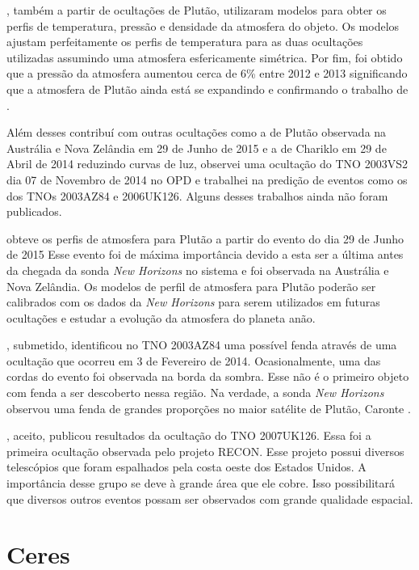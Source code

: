 \documentclass[12pt,a4paper]{report}
\begin{document}
\cite{DiasOliveira2015}, também a partir de ocultações de Plutão, utilizaram modelos para obter os perfis de temperatura, pressão e densidade da atmosfera do objeto. Os modelos ajustam perfeitamente os perfis de temperatura para as duas ocultações utilizadas assumindo uma atmosfera esfericamente simétrica. Por fim, foi obtido que a pressão da atmosfera aumentou cerca de 6\% entre 2012 e 2013 significando que a atmosfera de Plutão ainda está se expandindo e confirmando o trabalho de \cite{Olkin2015}.

Além desses contribuí com outras ocultações como a de Plutão observada na Austrália e Nova Zelândia em 29 de Junho de 2015 e a de Chariklo em 29 de Abril de 2014 reduzindo curvas de luz, observei uma ocultação do TNO 2003VS2 dia 07 de Novembro de 2014 no OPD e trabalhei na predição de eventos como os dos TNOs 2003AZ84 e 2006UK126. Alguns desses trabalhos ainda não foram publicados.

\cite{Sicardy2016} obteve os perfis de atmosfera para Plutão a partir do evento do dia 29 de Junho de 2015 Esse evento foi de máxima importância devido a esta ser a última antes da chegada da sonda \textit{New Horizons} no sistema e foi observada na Austrália e Nova Zelândia. Os modelos de perfil de atmosfera para Plutão poderão ser calibrados com os dados da \textit{New Horizons} para serem utilizados em futuras ocultações e estudar a evolução da atmosfera do planeta anão.

\cite{Alex2016}, submetido, identificou no TNO 2003AZ84 uma possível fenda através de uma ocultação que ocorreu em 3 de Fevereiro de 2014. Ocasionalmente, uma das cordas do evento foi observada na borda da sombra. Esse não é o primeiro objeto com fenda a ser descoberto nessa região. Na verdade, a sonda \textit{New Horizons} observou uma fenda de grandes proporções no maior satélite de Plutão, Caronte \citep{Stern2015}.

\cite{Rossi2016}, aceito, publicou resultados da ocultação do TNO 2007UK126. Essa foi a primeira ocultação observada pelo projeto RECON. Esse projeto possui diversos telescópios que foram espalhados pela costa oeste dos Estados Unidos. A importância desse grupo se deve à grande área que ele cobre. Isso possibilitará que diversos outros eventos possam ser observados com grande qualidade espacial.


\section{Ceres}
\label{Sub: Ceres}
\end{document}
